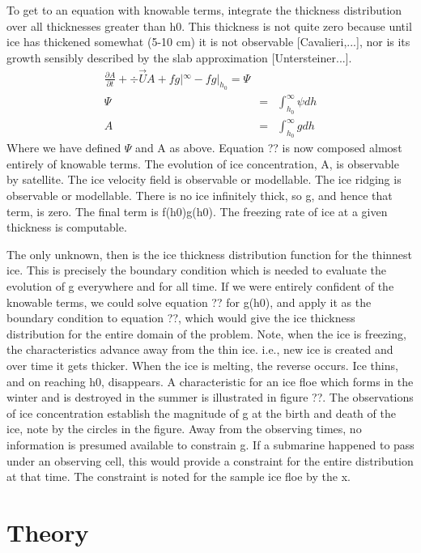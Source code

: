     To get to an equation with knowable terms, integrate the thickness 
distribution over all thicknesses greater than h0.  This thickness is
not quite zero because until ice has thickened somewhat (5-10 cm) it
is not observable [Cavalieri,...], nor is its growth sensibly described
by the slab approximation [Untersteiner...].  
\begin{eqnarray}
\frac {\partial A}{\partial t} + \div \vec{U}A + fg|^{\infty} - fg|_{h_0}
= \Psi \\
\Psi &=& \int_{h_0}^{\infty} \psi dh \\
A    &=& \int_{h_0}^{\infty} g   dh 
\end{eqnarray}
\noindent  Where we have defined $\Psi$ and A as above.  Equation ?? is now
composed almost entirely of knowable terms.  The evolution of ice 
concentration, A, is observable by satellite.  The ice velocity field is
observable or modellable.  The ice ridging is observable or modellable.
There is no ice infinitely thick, so g, and hence that term, is zero.
The final term is f(h0)g(h0).  The freezing rate of ice at a given thickness
is computable.  

    The only unknown, then is the ice thickness distribution
function for the thinnest ice.  This is precisely the boundary condition which
is needed to evaluate the evolution of g everywhere and for all time.
If we were entirely confident of the knowable terms, we could solve equation
?? for g(h0), and apply it as the boundary condition to equation ??,
which would give the ice thickness distribution for the entire domain of the
problem.  Note, when the ice is freezing, the characteristics advance away
from the thin ice.  i.e., new ice is created and over time it gets thicker.
When the ice is melting, the reverse occurs.  Ice thins, and on reaching
h0, disappears.  A characteristic for an ice floe which forms in the
winter and is destroyed in the summer is illustrated in figure ??.
The observations of ice concentration establish the magnitude of g at
the birth and death of the ice, note by the circles in the figure.  Away from
the observing times, no information is presumed available to constrain
g.  If a submarine happened to pass under an observing cell, this would
provide a constraint for the entire distribution at that time.  The
constraint is noted for the sample ice floe by the x.

\section{Theory}

